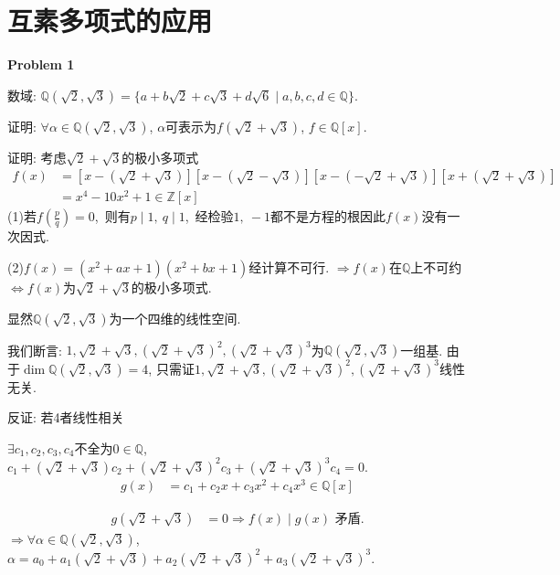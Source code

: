 \section{互素多项式的应用}
\textbf{Problem 1}
\par
数域: $\mathbb{Q}(\sqrt{2},\sqrt{3})=\{a + b\sqrt{2}+c\sqrt{3}+d\sqrt{6}\mid a,b,c,d\in\mathbb{Q}\}$.
\par
证明: $\forall\alpha\in\mathbb{Q}(\sqrt{2},\sqrt{3})$, $\alpha$可表示为$f(\sqrt{2}+\sqrt{3})$, $f\in\mathbb{Q}[x]$.
\par
\par
\par
证明: 考虑$\sqrt{2}+\sqrt{3}$的极小多项式
\[
\begin{align*}
f(x)&=[x - (\sqrt{2}+\sqrt{3})][x-(\sqrt{2}-\sqrt{3})][x-(-\sqrt{2}+\sqrt{3})][x+(\sqrt{2}+\sqrt{3})]\\
&=x^4 - 10x^2+1\in\mathbb{Z}[x]
\end{align*}
\]
(1)若$f(\frac{p}{q}) = 0$,\ 则有$p\mid1,\ q\mid1$,\ 经检验$1,\ -1$都不是方程的根因此$f(x)$没有一次因式.
\par
(2)$f(x)=(x^2+ax + 1)(x^2+bx + 1)$经计算不可行.
$\Rightarrow f(x)$在$\mathbb{Q}$上不可约$\Leftrightarrow f(x)$为$\sqrt{2}+\sqrt{3}$的极小多项式.
\par
显然$\mathbb{Q}(\sqrt{2},\sqrt{3})$为一个四维的线性空间.
\par
我们断言: $1,\sqrt{2}+\sqrt{3},(\sqrt{2}+\sqrt{3})^2,(\sqrt{2}+\sqrt{3})^3$为$\mathbb{Q}(\sqrt{2},\sqrt{3})$一组基. 由于$\dim\mathbb{Q}(\sqrt{2},\sqrt{3})=4$, 只需证$1,\sqrt{2}+\sqrt{3},(\sqrt{2}+\sqrt{3})^2,(\sqrt{2}+\sqrt{3})^3$线性无关.
\par
反证: 若4者线性相关
\par
$\exists c_1,c_2,c_3,c_4$不全为$0\in\mathbb{Q}$, $c_1+(\sqrt{2}+\sqrt{3})c_2+(\sqrt{2}+\sqrt{3})^2c_3+(\sqrt{2}+\sqrt{3})^3c_4 = 0$.
\[
\begin{align*}
g(x)&=c_1 + c_2x + c_3x^2 + c_4x^3\in\mathbb{Q}[x]
\end{align*}
\]
\par
\begin{align*} g(\sqrt{2}+\sqrt{3})&=0\Rightarrow f(x)\mid g(x)\text{ 矛盾}. 
\end{align*}
$\Rightarrow\forall\alpha\in\mathbb{Q}(\sqrt{2},\sqrt{3})$, $\alpha=a_0 + a_1(\sqrt{2}+\sqrt{3})+a_2(\sqrt{2}+\sqrt{3})^2+a_3(\sqrt{2}+\sqrt{3})^3$.
